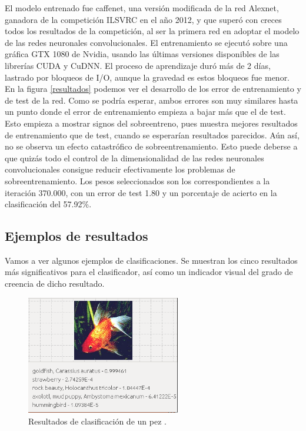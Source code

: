 El modelo entrenado fue caffenet, una versión modificada de la red Alexnet, ganadora de la competición ILSVRC en el año 2012, y que superó con creces todos los resultados de la competición, al ser la primera red en adoptar el modelo de las redes neuronales convolucionales. El entrenamiento se ejecutó sobre una gráfica GTX 1080 de Nvidia, usando las últimas versiones disponibles de las librerías CUDA y CuDNN. El proceso de aprendizaje duró más de 2 días, lastrado por bloqueos de I/O, aunque la gravedad es estos bloqueos fue menor.\\
 
En la figura \ref{resultados} podemos ver el desarrollo de los error de entrenamiento y de test de la red. Como se podría esperar, ambos errores son muy similares hasta un punto donde el error de entrenamiento empieza a bajar más que el de test. Esto empieza a mostrar signos del sobreentreno, pues muestra mejores resultados de entrenamiento que de test, cuando se esperarían resultados parecidos. Aún así, no se observa un efecto catastrófico de sobreentrenamiento. Esto puede deberse a que quizás todo el control de la dimensionalidad de las redes neuronales convolucionales consigue reducir efectivamente los problemas de sobreentrenamiento.  Los pesos seleccionados son los correspondientes a la iteración 370.000, con un error de test 1.80 y un porcentaje de acierto en la clasificación del 57.92\%.

\subsection{Ejemplos de resultados}

Vamos a ver algunos ejemplos de clasificaciones. Se muestran los cinco resultados más significativos para el clasificador, así como un indicador visual del grado de creencia de dicho resultado.\\

\begin{figure}[H]
\begin{center}

\includegraphics[width=0.6\textwidth]{img/Pez.png}
\end{center}

\caption{Resultados de clasificación de un pez .}
\end{figure}

